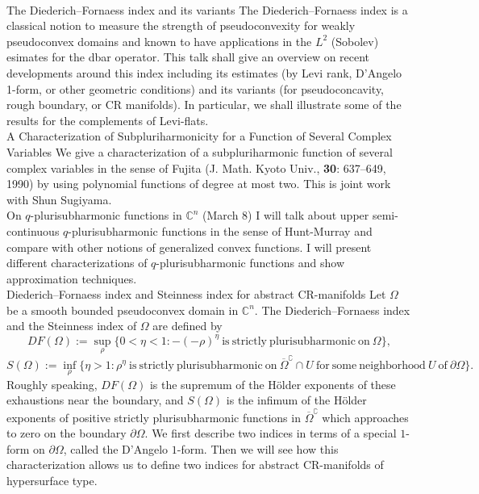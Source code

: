 \documentclass[a4]{article}
\theoremstyle{plain} %
\theoremstyle{definition} %
\begin{document}
\vskip5mm
\\
The Diederich--Fornaess index and its variants
\vskip3mm
The Diederich--Fornaess index is a classical notion to measure
the strength of pseudoconvexity for weakly pseudoconvex domains
and known to have applications in the $L^2$ (Sobolev) esimates for the dbar operator.
This talk shall give an overview on recent developments around this index
including its estimates (by Levi rank, D'Angelo 1-form, or other geometric conditions)
and its variants (for pseudoconcavity, rough boundary, or CR manifolds).
In particular, we shall illustrate some of the results for the complements of Levi-flats.
\vskip5mm
\\
A Characterization of Subpluriharmonicity for a Function of Several Complex Variables
\vskip3mm
We give a characterization of a subpluriharmonic function of several complex variables
in the sense of Fujita (J. Math. Kyoto Univ., {\bf 30}: 637--649, 1990) by using polynomial
functions of degree at most two.  This is joint work with Shun Sugiyama. 
\vskip5mm
\\
On $q$-plurisubharmonic functions in $\mathbb{C}^n$ (March 8)
\vskip3mm
I will talk about upper semi-continuous $q$-plurisubharmonic functions in the sense of Hunt-Murray and compare with other notions of generalized convex functions. I will present different characterizations of $q$-plurisubharmonic functions and show approximation techniques. 
\vskip5mm
\\
Diederich--Fornaess index and Steinness index for abstract CR-manifolds
\vskip3mm
Let $\Omega$ be a smooth bounded pseudoconvex domain in $\mathbb{C}^n$. 
The Diederich--Fornaess index and the Steinness index of $\Omega$ are defined by 
\[
DF(\Omega) := \sup_\rho \{0 < \eta < 1 : -(-\rho)^\eta\ \text{is}\ \text{strictly}\ \text{plurisubharmonic}\ \text{on}\ \Omega\},
\]
\[
S(\Omega) := \inf_\rho\{\eta > 1 : \rho^\eta\ \text{is}\ \text{strictly}\ \text{plurisubharmonic}\ \text{on}\ \overline{\Omega}^{\complement}\cap U\ \text{for}\ \text{some}\ \text{neighborhood}\ U\ \text{of}\ \partial\Omega\}.
\]
Roughly speaking, $DF(\Omega)$ is the supremum of the H\"older exponents of these exhaustions near the boundary, and $S(\Omega)$ is the infimum of the H\"older exponents of positive strictly plurisubharmonic functions in $\overline\Omega^{\complement}$ which approaches to zero on the boundary $\partial\Omega$. We first describe two indices in terms of a special $1$-form on $\partial\Omega$, called the D'Angelo $1$-form. Then we will see how this characterization allows us to define two indices for abstract CR-manifolds of hypersurface type. 
\end{document}
